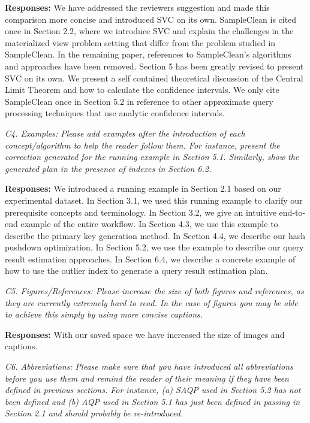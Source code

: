 \vspace{.25em}

{\bf Responses:} We have addressed the reviewers suggestion and made this comparison more concise and introduced SVC on its own. SampleClean is cited once in Section 2.2, where we introduce SVC and explain the challenges in the materialized view problem setting that differ from the problem studied in SampleClean. In the remaining paper, references to SampleClean’s algorithms and approaches have been removed. Section 5 has been greatly revised to present SVC on its own. We present a self contained theoretical discussion of the Central Limit Theorem and how to calculate the confidence intervals. We only cite SampleClean once in Section 5.2 in reference to other approximate query processing techniques that use analytic confidence intervals.

\vspace{1em}
\emph{C4. Examples: Please add examples after the introduction of each concept/algorithm to help the reader follow them. For instance, present the correction generated for the running example in Section 5.1. Similarly, show the generated plan in the presence of indexes in Section 6.2.}

\vspace{.25em}

{\bf Responses:} We introduced a running example in Section 2.1 based on our experimental dataset. In Section 3.1, we used this running example to clarify our prerequisite concepts and terminology. In Section 3.2, we give an intuitive end-to-end example of the entire workflow. In Section 4.3, we use this example to describe the primary key generation method. In Section 4.4, we describe our hash pushdown optimization. In Section 5.2, we use the example to describe our query result estimation approaches.  In Section 6.4, we describe a concrete example of how to use the outlier index to generate a query result estimation plan.

\vspace{1em}
\emph{C5. Figures/References: Please increase the size of both figures and references, as they are currently extremely hard to read. In the case of figures you may be able to achieve this simply by using more concise captions.}

\vspace{.25em}

{\bf Responses:} With our saved space we have increased the size of images and captions.

\vspace{1em}
\emph{C6. Abbreviations: Please make sure that you have introduced all abbreviations before you use them and remind the reader of their meaning if they have been defined in previous sections. For instance, (a) SAQP used in Section 5.2 has not been defined and (b) AQP used in Section 5.1 has just been defined in passing in Section 2.1 and should probably be re-introduced.}

